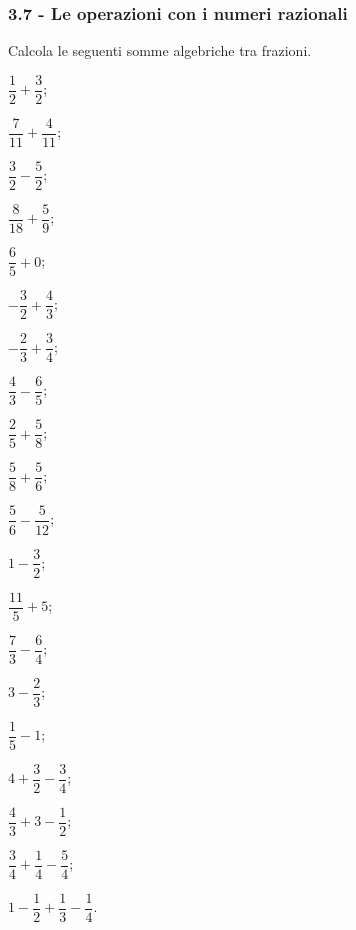 
\subsubsection*{3.7 - Le operazioni con i numeri razionali}


\begin{esercizio}[\Ast]
 \label{ese:3.45}
Calcola le seguenti somme algebriche tra frazioni.
\begin{multicols}{4}
\begin{enumeratea}
\spazielenx
\item $\dfrac{1}{2} + \dfrac{3}{2}$;
\item $\dfrac{7}{11} + \dfrac{4}{11}$;
\item $\dfrac{3}{2} - \dfrac{5}{2}$;
\item $\dfrac{8}{18} + \dfrac{5}{9}$;
\item $\dfrac{6}{5} + 0$;
\item $-\dfrac{3}{2}+\dfrac{4}{3}$;
\item $-\dfrac{2}{3}+\dfrac{3}{4}$;
\item $\dfrac{4}{3}-\dfrac{6}{5}$;
\item $\dfrac{2}{5}+\dfrac{5}{8}$;
\item $\dfrac{5}{8}+\dfrac{5}{6}$;
\item $\dfrac{5}{6}-\dfrac{5}{12}$;
\item $1-\dfrac{3}{2}$;
\item $\dfrac{11}{5}+5$;
\item $\dfrac{7}{3}-\dfrac{6}{4}$;
\item $3-\dfrac{2}{3}$;
\item $\dfrac{1}{5}-1$;
\item $4+\dfrac{3}{2}-\dfrac{3}{4}$;
\item $\dfrac{4}{3}+3-\dfrac{1}{2}$;
\item $\dfrac{3}{4}+\dfrac{1}{4}-\dfrac{5}{4}$;
\item $1-\dfrac{1}{2}+\dfrac{1}{3}-\dfrac{1}{4}$.
\end{enumeratea}
\end{multicols}
\end{esercizio}

